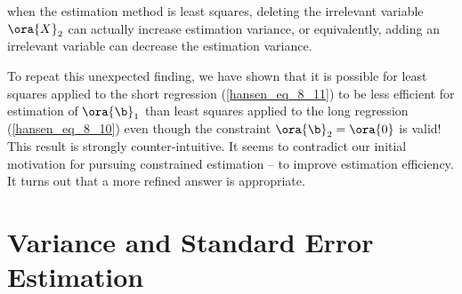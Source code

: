  when the estimation method is least squares, deleting the irrelevant variable $\ora{X}_2$ can actually increase estimation variance, or equivalently, adding an irrelevant variable can decrease the estimation variance.


To repeat this unexpected finding, we have shown that it is possible for least squares applied to the short regression (\ref{hansen_eq_8_11}) to be less efficient for estimation of $\ora{\b}_1$ than least squares applied to the long regression (\ref{hansen_eq_8_10}) even though the constraint $\ora{\b}_2 = \ora{0}$ is valid! This result is strongly counter-intuitive. It
seems to contradict our initial motivation for pursuing constrained estimation -- to improve estimation efficiency. It turns out that a more refined answer is appropriate. 

\section{Variance and Standard Error Estimation}
\setcounter{equation}{34}

